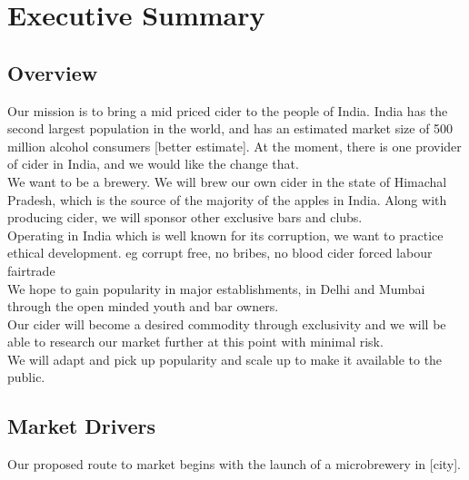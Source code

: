 \documentclass[11pt]{article}
\begin{document}
\newpage
\tableofcontents

\newpage

\section{Executive Summary}
  \subsection{Overview}

Our mission is to bring a mid priced cider to the people of India. India has the second largest population in the world, and has an estimated market size of 500 million alcohol consumers [better estimate]. At the moment, there is one provider of cider in India, and we would like the change that. \\

\noindent We want to be a brewery. We will brew our own cider in the state of Himachal Pradesh, which is the source of the majority of the apples in India. Along with producing cider, we will sponsor other exclusive bars and clubs. \\

\noindent Operating in India which is well known for its corruption, we want to practice ethical development. eg corrupt free, no bribes, no blood cider forced labour fairtrade \\

\noindent We hope to gain popularity in major establishments, in Delhi and Mumbai through the open minded youth and bar owners. \\

\noindent Our cider will become a desired commodity through exclusivity and we will be able to research our market further at this point with minimal risk. \\

\noindent We will adapt and pick up popularity and scale up to make it available to the public.

  \subsection{Market Drivers}
\noindent Our proposed route to market begins with the launch of a microbrewery in [city]. \\
\end{document}
